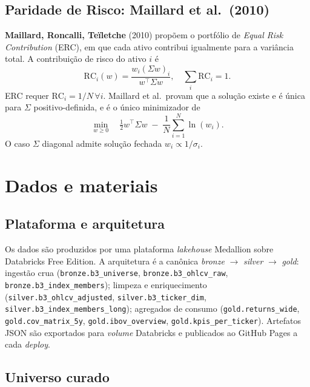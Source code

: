 \documentclass[12pt,a4paper,oneside]{article}
\begin{document}
\subsection{Paridade de Risco: Maillard et al.\ (2010)}

\textbf{Maillard, Roncalli, Teïletche} (2010) propõem o portfólio de
\textit{Equal Risk Contribution} (ERC), em que cada ativo contribui
igualmente para a variância total. A contribuição de risco do ativo
$i$ é
\begin{equation}\label{eq:rc}
\mathrm{RC}_i(w) = \frac{w_i (\Sigma w)_i}{w^\top \Sigma w}, \quad \sum_{i} \mathrm{RC}_i = 1.
\end{equation}
ERC requer $\mathrm{RC}_i = 1/N \, \forall i$. Maillard et al.\ provam
que a solução existe e é única para $\Sigma$ positivo-definida, e é
o único minimizador de
\begin{equation}\label{eq:erc-objective}
\min_{w \geq 0} \quad \tfrac{1}{2} w^\top \Sigma w
\;-\; \frac{1}{N} \sum_{i=1}^N \ln(w_i).
\end{equation}
O caso $\Sigma$ diagonal admite solução fechada
$w_i \propto 1/\sigma_i$.

\section{Dados e materiais}\label{sec:dados}

\subsection{Plataforma e arquitetura}

Os dados são produzidos por uma plataforma \textit{lakehouse} Medallion
sobre Databricks Free Edition. A arquitetura é a canônica
\textit{bronze} $\rightarrow$ \textit{silver} $\rightarrow$
\textit{gold}: ingestão crua (\texttt{bronze.b3\_universe},
\texttt{bronze.b3\_ohlcv\_raw}, \texttt{bronze.b3\_index\_members});
limpeza e enriquecimento (\texttt{silver.b3\_ohlcv\_adjusted},
\texttt{silver.b3\_ticker\_dim},
\texttt{silver.b3\_index\_members\_long}); agregados de consumo
(\texttt{gold.returns\_wide}, \texttt{gold.cov\_matrix\_5y},
\texttt{gold.ibov\_overview}, \texttt{gold.kpis\_per\_ticker}).
Artefatos JSON são exportados para \textit{volume} Databricks e
publicados ao GitHub Pages a cada \textit{deploy}.

\subsection{Universo curado}
\end{document}
